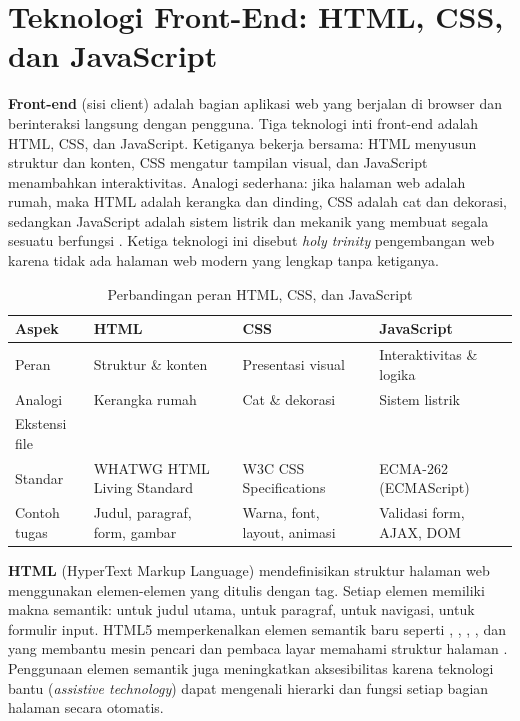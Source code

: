 ﻿\section{Teknologi Front-End: HTML, CSS, dan JavaScript}
\textbf{Front-end} (sisi client) adalah bagian aplikasi web yang berjalan di browser dan berinteraksi langsung dengan pengguna. Tiga teknologi inti front-end adalah HTML, CSS, dan JavaScript. Ketiganya bekerja bersama: HTML menyusun struktur dan konten, CSS mengatur tampilan visual, dan JavaScript menambahkan interaktivitas. Analogi sederhana: jika halaman web adalah rumah, maka HTML adalah kerangka dan dinding, CSS adalah cat dan dekorasi, sedangkan JavaScript adalah sistem listrik dan mekanik yang membuat segala sesuatu berfungsi \cite{mdnLearn}. Ketiga teknologi ini disebut \textit{holy trinity} pengembangan web karena tidak ada halaman web modern yang lengkap tanpa ketiganya.

\begin{table}[H]
\centering
\begin{tabular}{|P{2cm}|P{3cm}|P{3cm}|P{3.5cm}|}
\hline
\textbf{Aspek} & \textbf{HTML} & \textbf{CSS} & \textbf{JavaScript} \\
\hline
Peran & Struktur \& konten & Presentasi visual & Interaktivitas \& logika \\
\hline
Analogi & Kerangka rumah & Cat \& dekorasi & Sistem listrik \\
\hline
Ekstensi file &  &  &  \\
\hline
Standar & WHATWG HTML Living Standard & W3C CSS Specifications & ECMA-262 (ECMAScript) \\
\hline
Contoh tugas & Judul, paragraf, form, gambar & Warna, font, layout, animasi & Validasi form, AJAX, DOM \\
\hline
\end{tabular}
\caption{Perbandingan peran HTML, CSS, dan JavaScript}
\end{table}

\textbf{HTML} (HyperText Markup Language) mendefinisikan struktur halaman web menggunakan elemen-elemen yang ditulis dengan tag. Setiap elemen memiliki makna semantik:  untuk judul utama,  untuk paragraf,  untuk navigasi,  untuk formulir input. HTML5 memperkenalkan elemen semantik baru seperti , , , , dan  yang membantu mesin pencari dan pembaca layar memahami struktur halaman \cite{mdnHtmlIntro}. Penggunaan elemen semantik juga meningkatkan aksesibilitas karena teknologi bantu (\textit{assistive technology}) dapat mengenali hierarki dan fungsi setiap bagian halaman secara otomatis.


